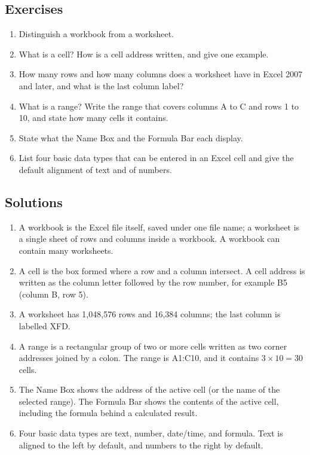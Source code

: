 \documentclass[11pt]{article}
\begin{document}
\subsection*{Exercises}
\begin{enumerate}[label=\arabic*.]
  \item Distinguish a workbook from a worksheet.
  \item What is a cell? How is a cell address written, and give one example.
  \item How many rows and how many columns does a worksheet have in Excel
    2007 and later, and what is the last column label?
  \item What is a range? Write the range that covers columns A to C and rows
    1 to 10, and state how many cells it contains.
  \item State what the Name Box and the Formula Bar each display.
  \item List four basic data types that can be entered in an Excel cell and
    give the default alignment of text and of numbers.
\end{enumerate}

\subsection*{Solutions}
\begingroup\small
\begin{enumerate}[label=\arabic*.]
  \item A workbook is the Excel file itself, saved under one file name; a
    worksheet is a single sheet of rows and columns inside a workbook. A
    workbook can contain many worksheets.
  \item A cell is the box formed where a row and a column intersect. A cell
    address is written as the column letter followed by the row number, for
    example B5 (column B, row 5).
  \item A worksheet has 1,048,576 rows and 16,384 columns; the last column is
    labelled XFD.
  \item A range is a rectangular group of two or more cells written as two
    corner addresses joined by a colon. The range is A1:C10, and it contains
    $3 \times 10 = 30$ cells.
  \item The Name Box shows the address of the active cell (or the name of the
    selected range). The Formula Bar shows the contents of the active cell,
    including the formula behind a calculated result.
  \item Four basic data types are text, number, date/time, and formula. Text
    is aligned to the left by default, and numbers to the right by default.
\end{enumerate}
\endgroup
\end{document}
